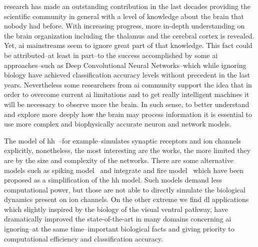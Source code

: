 \documentclass[10pt,journal,compsoc]{IEEEtran}
\begin{document}
% 
% 
% 
% 

 

 research has made an outstanding contribution in the last decades providing the scientific community in general with a level of knowledge about the brain that nobody had before. With increasing progress, more in-depth understanding on the brain organization including the thalamus and the cerebral cortex is revealed. Yet, \gls{ai} mainstreams seem to ignore great part of that knowledge. This fact could be attributed--at least in part--to the success accomplished by some \gls{ai} approaches–such as Deep Convolutional Neural Networks–which while ignoring biology have achieved classification accuracy levels without precedent in the last years. Nevertheless some researchers from \gls{ai} community support the idea that in order to overcome current \gls{ai} limitations and to get really intelligent machines it will be necessary to observe more the brain. In such sense, to better understand and explore more deeply how the brain may process information it is essential to use more complex and biophysically accurate neuron and network models.

The model of \gls{hh}~\cite{HODGKIN199025}--for example--simulates synaptic receptors and ion channels explicitly, nonetheless, the most interesting are the works, the more limited they are by the size and complexity of the networks. There are some alternative models such as spiking model~\cite{Izhikevich2004SpiketimingDO} and integrate and fire model~\cite{1333071} which have been proposed as a simplification of the \gls{hh} model. Such models demand less computational power, but those are not able to directly simulate the biological dynamics present on ion channels. On the other extreme we find \gls{dl} applications~\cite{lecun_deep_2015} which slightly inspired by the biology of the visual ventral pathway, have dramatically improved the state-of-the-art in many domains concerning \gls{ai} ignoring--at the same time--important biological facts and giving priority to computational efficiency and classification accuracy. 
\end{document}

